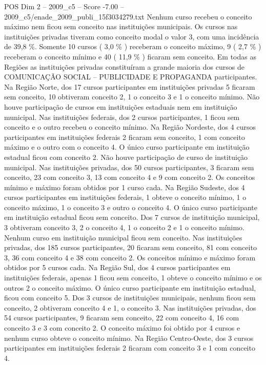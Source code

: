 \begin{textsample}{POS Dim 2 – 2009\_c5 – Score -7.00 – 2009\_c5/enade\_2009\_publi\_15f3034279.txt}
Nenhum curso recebeu o conceito máximo nem ficou sem conceito nas instituições municipais.
Os cursos nas instituições privadas tiveram como conceito modal o valor 3, com uma incidência de 39,8 \%.
Somente 10 cursos ( 3,0 \% ) receberam o conceito máximo, 9 ( 2,7 \% ) receberam o conceito mínimo e 40 ( 11,9 \% ) ficaram sem conceito.
Em todas as Regiões as instituições privadas constituíram a grande maioria dos cursos de COMUNICAÇÃO SOCIAL – PUBLICIDADE E PROPAGANDA participantes.
Na Região Norte, dos 17 cursos participantes em instituições privadas 5 ficaram sem conceito, 10 obtiveram conceito 2, 1 o conceito 3 e 1 o conceito mínimo.
Não houve participação de cursos em instituições estaduais nem em instituição municipal.
Nas instituições federais, dos 2 cursos participantes, 1 ficou sem conceito e o outro recebeu o conceito mínimo.
Na Região Nordeste, dos 4 cursos participantes em instituições federais 2 ficaram sem conceito, 1 com conceito máximo e o outro com o conceito 4.
O único curso participante em instituição estadual ficou com conceito 2.
Não houve participação de curso de instituição municipal.
Nas instituições privadas, dos 50 cursos participantes, 3 ficaram sem conceito, 23 com conceito 3, 13 com conceito 4 e 9 com conceito 2.
Os conceitos mínimo e máximo foram obtidos por 1 curso cada.
Na Região Sudeste, dos 4 cursos participantes em instituições federais, 1 obteve o conceito mínimo, 1 o conceito máximo, 1 o conceito 3 e outro o conceito 4.
O único curso participante em instituição estadual ficou sem conceito.
Dos 7 cursos de instituição municipal, 3 obtiveram conceito 3, 2 o conceito 4, 1 o conceito 2 e 1 o conceito mínimo.
Nenhum curso em instituição municipal ficou sem conceito.
Nas instituições privadas, dos 185 cursos participantes, 20 ficaram sem conceito, 81 com conceito 3, 36 com conceito 4 e 38 com conceito 2.
Os conceitos mínimo e máximo foram obtidos por 5 cursos cada.
Na Região Sul, dos 4 cursos participantes em instituições federais, apenas 1 ficou sem conceito, 1 obteve o conceito mínimo e os outros 2 o conceito máximo.
O único curso participante em instituição estadual, ficou com conceito 5.
Dos 3 cursos de instituições municipais, nenhum ficou sem conceito, 2 obtiveram conceito 4 e 1, o conceito 3.
Nas instituições privadas, dos 54 cursos participantes, 9 ficaram sem conceito, 22 com conceito 4, 16 com conceito 3 e 3 com conceito 2.
O conceito máximo foi obtido por 4 cursos e nenhum curso obteve o conceito mínimo.
Na Região Centro-Oeste, dos 3 cursos participantes em instituições federais 2 ficaram com conceito 3 e 1 com conceito 4.

\end{textsample}
